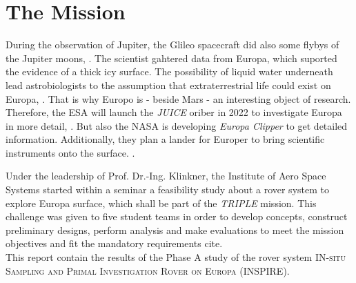 %
%
%
\chapter{The Mission}
\label{chap:mission}

During the observation  of Jupiter, the Glileo spacecraft did also some flybys of the Jupiter moons, \cite{Mission_01}.
The scientist gahtered data from Europa, which suported the evidence of a thick icy surface.
The possibility of liquid water underneath lead astrobiologists to the assumption that extraterrestrial life could exist on Europa, \cite{Mission_02}.
That is why Europo is - beside Mars - an interesting object of research.\\

Therefore, the ESA will launch the \textit{JUICE} oriber in 2022 to investigate Europa in more detail, \cite{Mission_03}. 
But also the NASA is developing  \textit{Europa Clipper} to get detailed information.
Additionally, they plan a lander for Europer to bring scientific instruments onto the surface. \cite{Mission_04} \cite{Mission_05}.

Under the leadership of  Prof. Dr.-Ing. Klinkner, the Institute of Aero Space Systems started within a seminar a feasibility study about a rover system to explore Europa surface, which shall  be part of the \textit{TRIPLE} mission.
This challenge was given to five student teams in order to develop concepts, construct preliminary designs, perform analysis and make evaluations to  meet the mission objectives and fit the mandatory requirements cite. \\


This report contain the results of the Phase A study of the rover system \textsc{IN-situ Sampling and Primal Investigation Rover on Europa}  (INSPIRE).
